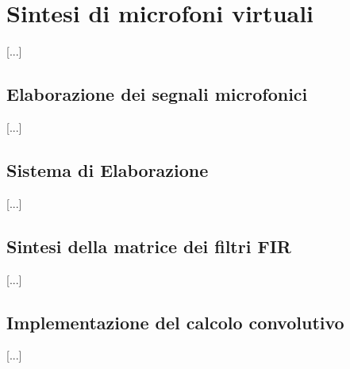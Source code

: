 \chapter{Sintesi di microfoni virtuali}
\label{sec:virtmikes}
[...]\\


\section{Elaborazione dei segnali microfonici}
\label{sec:}
	
	[...]\\

\section{Sistema di Elaborazione}
\label{sec:sistelab}
	
	[...]\\
	
\section{Sintesi della matrice dei filtri FIR}
\label{sec:}
	[...]\\
	
	
		
\section{Implementazione del calcolo convolutivo}
\label{sec:}
	[...]\\
	
